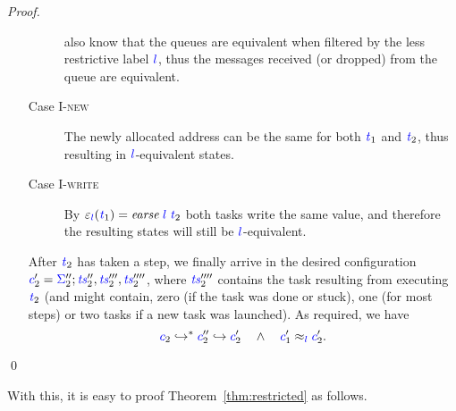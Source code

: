 \documentclass{llncs}
\newcommand{\Varid}[1]{\mathit{#1}}
\begin{document}
\begin{proof}
\begin{itemize}
\begin{description}
      also know that the queues are equivalent when filtered by the less
      restrictive label \ensuremath{\ifc{l}}, thus the messages received (or dropped) from the
      queue are equivalent.
      \item[Case \textsc{I-new}] The newly allocated address can be the same
      for both \ensuremath{\ifc{\Varid{t}}_{1}} and \ensuremath{\ifc{\Varid{t}}_{2}}, thus resulting in \ensuremath{\ifc{l}}-equivalent states.
      \item[Case \textsc{I-write}] By \ensuremath{\varepsilon_{\ifc{l}}(\ifc{\Varid{t}}_{1})\mathrel{=}\Varid{earse}\;\ifc{l}\;\ifc{\Varid{t}}_{2}} both tasks
      write the same value, and therefore the resulting states will still
      be \ensuremath{\ifc{l}}-equivalent.
    \end{description}
    After \ensuremath{\ifc{\Varid{t}}_{2}} has taken a step, we finally arrive in the desired
    configuration \ensuremath{\ifc{c}_{2}'\mathrel{=}\ifc{\Sigma}_{2}'';\ifc{\Varid{ts}}_{2}'',\ifc{\Varid{ts}}_{2}''',\ifc{\Varid{ts}}_{2}''''}, where
    \ensuremath{\ifc{\Varid{ts}}_{2}''''} contains the task resulting from executing \ensuremath{\ifc{\Varid{t}}_{2}} (and
    might contain, zero (if the task was done or stuck), one (for most steps) or two tasks if a new task was launched).
    As required, we have
    \[ {\color{blue} c}_{2} \hookrightarrow^* {\color{blue} c}_{2}'' \hookrightarrow {\color{blue} c}_{2}'
    \quad \land \quad {\color{blue} c}_{1}' \approx_{{\color{blue} l}} {\color{blue} c}_{2}' \text{.}\]
  \end{itemize}
  \qed
\end{proof}
With this, it is easy to proof Theorem~\ref{thm:restricted} as follows.
\end{document}
